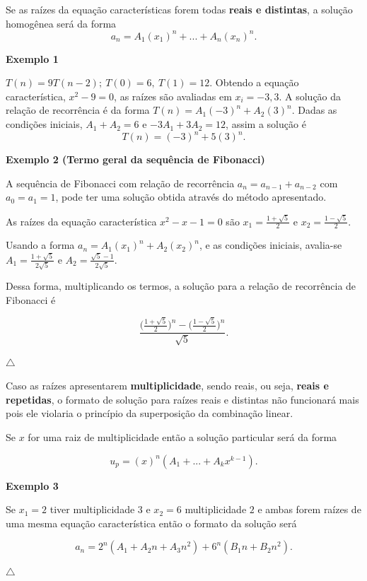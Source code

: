Se as raízes da equação características forem todas \textbf{reais e distintas}, a solução homogênea será da forma
\[a_n = A_1(x_1)^n + ... + A_n(x_n)^n.\]

\textbf{Exemplo 1}

$T(n) = 9T(n-2); \ T(0) = 6,  \ T(1) = 12$. Obtendo a equação característica, $x^2 - 9 = 0$, as raízes são avaliadas em $x_i = {-3,3}$. A solução da relação de recorrência é da forma $T(n) = A_1(-3)^n + A_2(3)^n$. Dadas as condições iniciais, $A_1 + A_2 = 6$ e $-3A_1 + 3A_2 = 12$, assim a solução é 
\[T(n) = (-3)^n + 5(3)^n.\]

\textbf{Exemplo 2 (Termo geral da sequência de Fibonacci)}

A sequência de Fibonacci com relação de recorrência $a_n = a_{n-1} + a_{n-2}$ com $a_0 = a_1 = 1$, pode ter uma solução obtida através do método apresentado.

As raízes da equação característica $x^2 - x - 1 = 0$ são $x_1 = \frac{1+\sqrt{5}}{2}$ e $x_2 = \frac{1 - \sqrt{5}}{2}$.

Usando a forma $a_n = A_1(x_1)^n + A_2(x_2)^n$, e as condições iniciais, avalia-se $A_1 = \frac{1 + \sqrt{5}}{2\sqrt{5}}$ e $A_2 = \frac{\sqrt{5} - 1 }{2\sqrt{5}}$.

Dessa forma, multiplicando os termos, a solução para a relação de recorrência de Fibonacci é 

\[\frac{\Bigr(\frac{1+\sqrt{5}}{2}\Bigr)^n-\Bigr(\frac{1 - \sqrt{5}}{2}\Bigr)^n}{\sqrt{5}}.\]

{\raggedleft $\bigtriangleup$ \par}

Caso as raízes apresentarem \textbf{multiplicidade}, sendo reais, ou seja, \textbf{reais e repetidas}, o formato de solução para raízes reais e distintas não funcionará mais pois ele violaria o princípio da superposição da combinação linear.

Se $x$ for uma raiz de multiplicidade então a solução particular será da forma

\[u_p = (x)^n(A_1 + ... + A_{k}x^{k-1}).\]

\textbf{Exemplo 3}

Se $x_1 = 2$ tiver multiplicidade $3$ e $x_2 = 6$ multiplicidade $2$ e ambas forem raízes de uma mesma equação característica então o formato da solução será

\[a_n = 2^n(A_1 + A_2n + A_3n^2) + 6^n(B_1n + B_2n^2).\]

{\raggedleft $\bigtriangleup$ \par}

